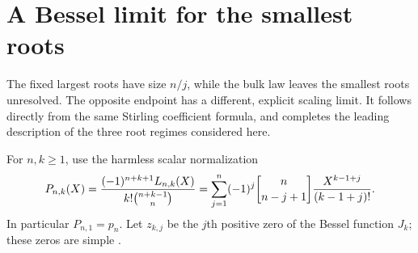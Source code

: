 \section{A Bessel limit for the smallest roots}
\label{sec:bessel-edge}

The fixed largest roots have size $n/j$, while the bulk law leaves the
smallest roots unresolved. The opposite endpoint has a different,
explicit scaling limit. It follows directly from the same Stirling
coefficient formula, and completes the leading description of the
three root regimes considered here.

For $n,k\geq1$, use the harmless scalar normalization
\begin{equation}\label{eq:bessel-normalization}
 P_{n,k}(X)=\frac{(-1)^{n+k+1}L_{n,k}(X)}
                   {k!\binom{n+k-1}{n}}
 =\sum_{j=1}^n(-1)^j\stirling{n}{n-j+1}
                     \frac{X^{k-1+j}}{(k-1+j)!}.
\end{equation}
In particular $P_{n,1}=p_n$. Let $z_{k,j}$ be the $j$th positive
zero of the Bessel function $J_k$; these zeros are simple
\cite{DLMFBessel}.

